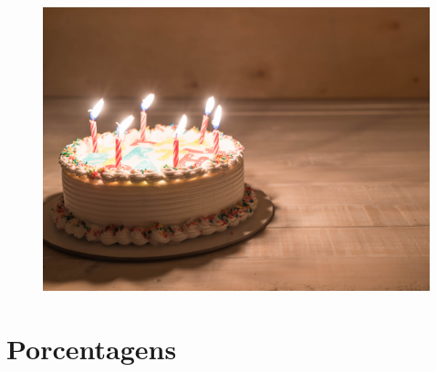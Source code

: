 \begin{figure}[H]
\centering\includegraphics[width=\textwidth,keepaspectratio]{./imgSAEB_8_MAT/media/image64.png}
\end{figure}














\chapter{Porcentagens}

